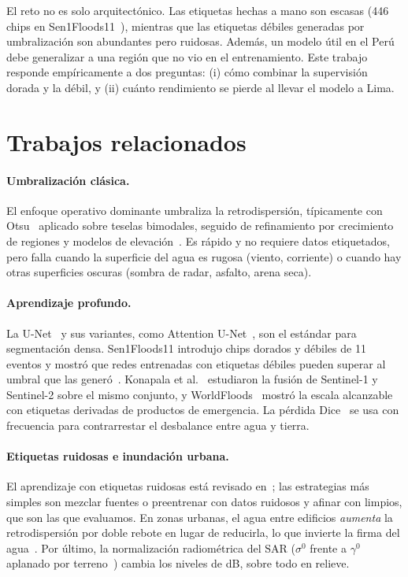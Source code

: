 \documentclass{article}
\begin{document}
El reto no es solo arquitectónico. Las etiquetas hechas a mano son escasas (446 chips en
Sen1Floods11~\cite{bonafilia2020sen1floods11}), mientras que las etiquetas débiles generadas por
umbralización son abundantes pero ruidosas. Además, un modelo útil en el Perú debe generalizar a una
región que no vio en el entrenamiento. Este trabajo responde empíricamente a dos preguntas: (i) cómo
combinar la supervisión dorada y la débil, y (ii) cuánto rendimiento se pierde al llevar el modelo a
Lima.

\section{Trabajos relacionados}

\paragraph{Umbralización clásica.} El enfoque operativo dominante umbraliza la retrodispersión,
típicamente con Otsu~\cite{otsu1979} aplicado sobre teselas bimodales, seguido de refinamiento por
crecimiento de regiones y modelos de elevación~\cite{martinis2015fully,twele2016sentinel}. Es rápido y no
requiere datos etiquetados, pero falla cuando la superficie del agua es rugosa (viento, corriente) o
cuando hay otras superficies oscuras (sombra de radar, asfalto, arena seca).

\paragraph{Aprendizaje profundo.} La U-Net~\cite{ronneberger2015unet} y sus variantes, como
Attention U-Net~\cite{oktay2018attention}, son el estándar para segmentación densa. Sen1Floods11
introdujo chips dorados y débiles de 11 eventos y mostró que redes entrenadas con etiquetas débiles
pueden superar al umbral que las generó~\cite{bonafilia2020sen1floods11}.
Konapala et al.~\cite{konapala2021exploring} estudiaron la fusión de Sentinel-1 y Sentinel-2 sobre el
mismo conjunto, y WorldFloods~\cite{mateo2021towards} mostró la escala alcanzable con etiquetas
derivadas de productos de emergencia. La pérdida Dice~\cite{milletari2016vnet} se usa con frecuencia
para contrarrestar el desbalance entre agua y tierra.

\paragraph{Etiquetas ruidosas e inundación urbana.} El aprendizaje con etiquetas ruidosas está
revisado en~\cite{frenay2014classification}; las estrategias más simples son mezclar fuentes o
preentrenar con datos ruidosos y afinar con limpios, que son las que evaluamos. En zonas urbanas, el
agua entre edificios \emph{aumenta} la retrodispersión por doble rebote en lugar de reducirla, lo que
invierte la firma del agua~\cite{mason2010urban}. Por último, la normalización radiométrica del SAR
($\sigma^0$ frente a $\gamma^0$ aplanado por terreno~\cite{small2011flattening}) cambia los niveles de
dB, sobre todo en relieve.
\end{document}

